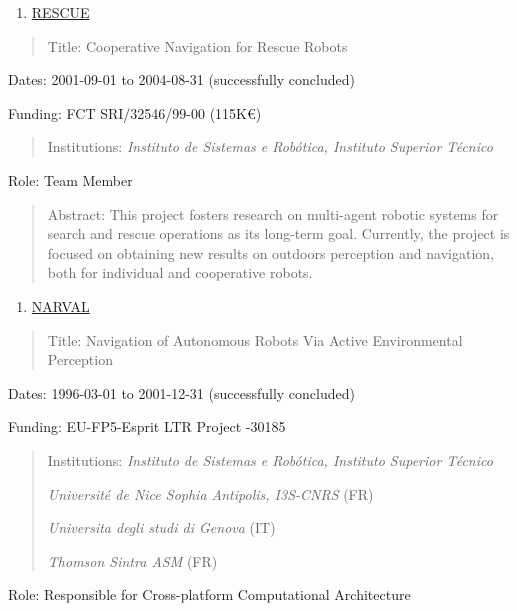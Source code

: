 \documentclass[
]{article}
\begin{document}
\begin{enumerate}
\def\labelenumi{\arabic{enumi}.}
\setcounter{enumi}{18}
\item
  \ul{RESCUE}
\end{enumerate}

\begin{quote}
Title: Cooperative Navigation for Rescue Robots
\end{quote}

Dates: 2001-09-01 to 2004-08-31 (successfully concluded)

Funding: FCT SRI/32546/99-00 (115K€)

\begin{quote}
Institutions: \emph{Instituto de Sistemas e Robótica, Instituto Superior
Técnico}
\end{quote}

Role: Team Member

\begin{quote}
Abstract: This project fosters research on multi-agent robotic systems
for search and rescue operations as its long-term goal. Currently, the
project is focused on obtaining new results on outdoors perception and
navigation, both for individual and cooperative robots.
\end{quote}

\begin{enumerate}
\def\labelenumi{\arabic{enumi}.}
\setcounter{enumi}{19}
\item
  \ul{NARVAL}
\end{enumerate}

\begin{quote}
Title: Navigation of Autonomous Robots Via Active Environmental
Perception
\end{quote}

Dates: 1996-03-01 to 2001-12-31 (successfully concluded)

Funding: EU-FP5-Esprit LTR Project -30185

\begin{quote}
Institutions: \emph{Instituto de Sistemas e Robótica, Instituto Superior
Técnico}

\emph{Université de Nice Sophia Antipolis, I3S-CNRS} (FR)

\emph{Universita degli studi di Genova} (IT)

\emph{Thomson Sintra ASM} (FR)
\end{quote}

Role: Responsible for Cross-platform Computational Architecture
\end{document}
